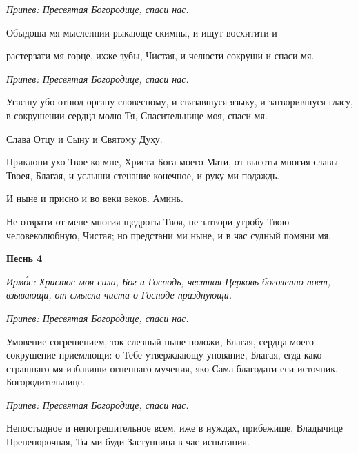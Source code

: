  \itshape Припев:\normalfont{} Пресвятая Богородице, спаси нас.



   Обыдоша мя мысленнии рыкающе скимны, и ищут восхитити и

растерзати мя горце, ихже зубы, Чистая, и челюсти сокруши и спаси
мя.



 \itshape Припев:\normalfont{} Пресвятая Богородице, спаси нас.



   Угасшу убо отнюд органу словесному, и связавшуся языку, и
затворившуся гласу, в сокрушении сердца молю Тя, Спасительнице моя,
спаси мя.



   Слава Отцу и Сыну и Святому Духу.



   Приклони ухо Твое ко мне, Христа Бога моего Мати, от высоты
многия славы Твоея, Благая, и услыши стенание конечное, и руку ми
подаждь.



   И ныне и присно и во веки веков. Аминь.



   Не отврати от мене многия щедроты Твоя, не затвори утробу Твою
человеколюбную, Чистая; но предстани ми ныне, и в час судный помяни
мя.



 

\bfseries Песнь 4\normalfont{}


 \itshape Ирмо́с:\normalfont{} Христос моя сила, Бог и Господь, честная Церковь боголепно поет,
взывающи, от смысла чиста о Господе празднующи.



 \itshape Припев:\normalfont{} Пресвятая Богородице, спаси нас.



   Умовение согрешением, ток слезный ныне положи, Благая, сердца моего
сокрушение приемлющи: о Тебе утверждающу упование, Благая, егда како
страшнаго мя избавиши огненнаго мучения, яко Сама благодати еси
источник, Богородительнице.



 \itshape Припев:\normalfont{} Пресвятая Богородице, спаси нас.



   Непостыдное и непогрешительное всем, иже в нуждах, прибежище,
Владычице Пренепорочная, Ты ми буди Заступница в час испытания.



